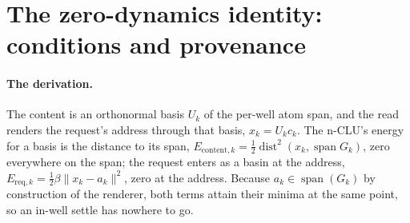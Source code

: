 \documentclass{article} %
\begin{document}
\section{The zero-dynamics identity: conditions and provenance}
\label{app:clue}

\paragraph{The derivation.} The content is an orthonormal basis $U_k$ of the
per-well atom span, and the read renders the request's address through that basis,
$x_k=U_k c_k$. The n-CLU's energy for a basis is the distance to its span,
$E_{\text{content},k}=\tfrac12\operatorname{dist}^2(x_k,\operatorname{span}G_k)$, zero everywhere
on the span; the request enters as a basin at the address, $E_{\text{req},k}=\tfrac12\beta\lVert
x_k-a_k\rVert^2$, zero at the address. Because $a_k\in\operatorname{span}(G_k)$ by construction
of the renderer, both terms attain their minima at the same point, so an in-well settle has
nowhere to go. 
\end{document}

